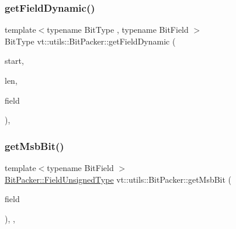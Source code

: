 \subsubsection{\texorpdfstring{get\+Field\+Dynamic()}{getFieldDynamic()}}
{\footnotesize\ttfamily template$<$typename Bit\+Type , typename Bit\+Field $>$ \\
Bit\+Type vt\+::utils\+::\+Bit\+Packer\+::get\+Field\+Dynamic (\begin{DoxyParamCaption}\item[{\hyperlink{structvt_1_1utils_1_1_bit_packer_a23024285425933c1f10c8fc3942f9beb}{Field\+Type}}]{start,  }\item[{\hyperlink{structvt_1_1utils_1_1_bit_packer_a23024285425933c1f10c8fc3942f9beb}{Field\+Type}}]{len,  }\item[{Bit\+Field const \&}]{field }\end{DoxyParamCaption})\hspace{0.3cm}{\ttfamily [inline]}, {\ttfamily [static]}}

\mbox{\label{structvt_1_1utils_1_1_bit_packer_a6806b7d631e1fbcd44e50b02df8f93d6}} 
\subsubsection{\texorpdfstring{get\+Msb\+Bit()}{getMsbBit()}}
{\footnotesize\ttfamily template$<$typename Bit\+Field $>$ \\
\hyperlink{structvt_1_1utils_1_1_bit_packer_a0bbc37c21a19e6c5311c6e9282a1e6f8}{Bit\+Packer\+::\+Field\+Unsigned\+Type} vt\+::utils\+::\+Bit\+Packer\+::get\+Msb\+Bit (\begin{DoxyParamCaption}\item[{Bit\+Field const \&}]{field }\end{DoxyParamCaption})\hspace{0.3cm}{\ttfamily [inline]}, {\ttfamily [static]}, {\ttfamily [private]}}

\mbox{\label{structvt_1_1utils_1_1_bit_packer_a4bffe5bd05d11955016e5f8f9161893b}} 
